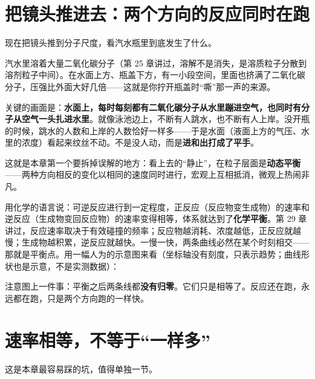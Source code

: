 \section{把镜头推进去：两个方向的反应同时在跑}

现在把镜头推到分子尺度，看汽水瓶里到底发生了什么。

汽水里溶着大量二氧化碳分子（第 25 章讲过，溶解不是消失，是溶质粒子分散到溶剂粒子中间）。在水面上方、瓶盖下方，有一小段空间，里面也挤满了二氧化碳分子，压强比外面大好几倍——这就是你拧开瓶盖时“嘶”那一声的来源。

关键的画面是：\textbf{水面上，每时每刻都有二氧化碳分子从水里蹦进空气，也同时有分子从空气一头扎进水里}。就像泳池边上，不断有人跳水，也不断有人上岸。没开瓶的时候，跳水的人数和上岸的人数恰好一样多——于是水面（液面上方的气压、水里的浓度）看起来纹丝不动。不是没人动，而是\textbf{进和出打成了平手}。

这就是本章第一个要拆掉误解的地方：看上去的“静止”，在粒子层面是\textbf{动态平衡}——两种方向相反的变化以相同的速度同时进行，宏观上互相抵消，微观上热闹非凡。

用化学的语言说：可逆反应进行到一定程度，正反应（反应物变生成物）的速率和逆反应（生成物变回反应物）的速率变得相等，体系就达到了\textbf{化学平衡}。第 29 章讲过，反应速率取决于有效碰撞的频率；反应物越消耗、浓度越低，正反应就越慢；生成物越积累，逆反应就越快。一慢一快，两条曲线必然在某个时刻相交——那就是平衡点。用一幅人为的示意图来看（坐标轴没有刻度，只表示趋势；曲线形状也是示意，不是实测数据）：

\begin{center}
\end{center}

注意图上一件事：平衡之后两条线都\textbf{没有归零}。它们只是相等了。反应还在跑，永远都在跑，只是两个方向跑的一样快。

\section{速率相等，不等于“一样多”}

这是本章最容易踩的坑，值得单独一节。

